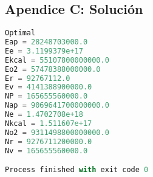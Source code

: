 \documentclass[12pt]{report}
\begin{document}
\subsection*{Apendice C: Soluci\'on}

\begin{lstlisting}[language=Python, frame=single, basicstyle=\tiny]
Optimal
Eap = 28248703000.0
Ee = 3.1199379e+17
Ekcal = 55107800000000.0
Eo2 = 57478388000000.0
Er = 92767112.0
Ev = 4141388900000.0
NP = 165655560000.0
Nap = 9069641700000000.0
Ne = 1.4702708e+18
Nkcal = 1.511607e+17
No2 = 9311498800000000.0
Nr = 9276711200000.0
Nv = 165655560000.0

Process finished with exit code 0
\end{lstlisting}
\end{document}
